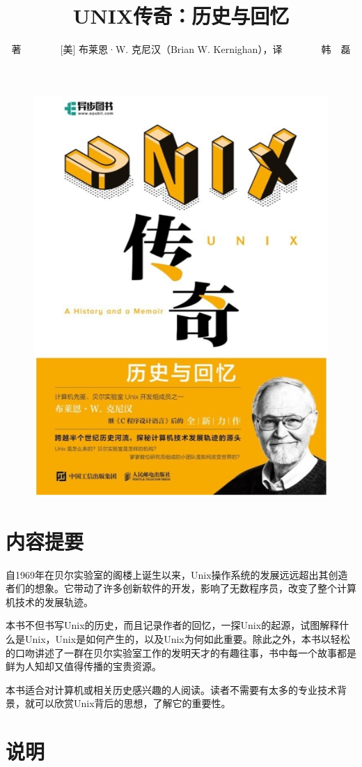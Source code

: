 \documentclass[a4paper,12pt,UTF8,twoside]{ctexbook}
\title{\heiti\zihao{0} UNIX传奇：历史与回忆}
\author{著　　　　[美] 布莱恩·W. 克尼汉（Brian W. Kernighan），译　　　　韩　磊}
\date{}
\begin{document}
\maketitle
\tableofcontents

\frontmatter

\begin{figure}[htbp]
	\centering
	\includegraphics[width=0.7\linewidth]{cover}
	\caption{}
	\label{fig:1}
\end{figure}

\chapter{内容提要}

自1969年在贝尔实验室的阁楼上诞生以来，Unix操作系统的发展远远超出其创造者们的想象。它带动了许多创新软件的开发，影响了无数程序员，改变了整个计算机技术的发展轨迹。

本书不但书写Unix的历史，而且记录作者的回忆，一探Unix的起源，试图解释什么是Unix，Unix是如何产生的，以及Unix为何如此重要。除此之外，本书以轻松的口吻讲述了一群在贝尔实验室工作的发明天才的有趣往事，书中每一个故事都是鲜为人知却又值得传播的宝贵资源。

本书适合对计算机或相关历史感兴趣的人阅读。读者不需要有太多的专业技术背景，就可以欣赏Unix背后的思想，了解它的重要性。

\chapter{说明}
\end{document}
